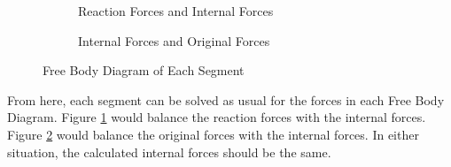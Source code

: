 \documentclass[12pt]{article}
\begin{document}
\begin{figure}[H]
  \centering
  \begin{subfigure}[b]{0.45\textwidth}
    \centering
    
    \caption{Reaction Forces and Internal Forces}
    \label{fig:027}
  \end{subfigure}
  \begin{subfigure}[b]{0.45\textwidth}
    \centering
    
    \caption{Internal Forces and Original Forces}
    \label{fig:026}
  \end{subfigure}
  \caption{Free Body Diagram of Each Segment}
  \label{fig:fbdOfEachSegment}
\end{figure}
From here, each segment can be solved as usual for the forces in each Free Body Diagram.
Figure \ref{fig:027} would balance the reaction forces with the internal forces. Figure \ref{fig:026}
would balance the original forces with the internal forces. In either situation, the
calculated internal forces should be the same.
\end{document}

